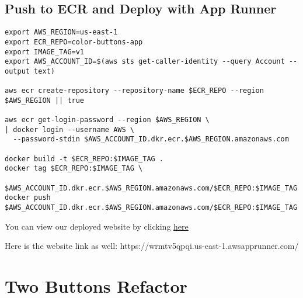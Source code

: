 \subsection{Push to ECR and Deploy with App Runner}
\begin{verbatim}
export AWS_REGION=us-east-1
export ECR_REPO=color-buttons-app
export IMAGE_TAG=v1
export AWS_ACCOUNT_ID=$(aws sts get-caller-identity --query Account --output text)

aws ecr create-repository --repository-name $ECR_REPO --region $AWS_REGION || true

aws ecr get-login-password --region $AWS_REGION \
| docker login --username AWS \
  --password-stdin $AWS_ACCOUNT_ID.dkr.ecr.$AWS_REGION.amazonaws.com

docker build -t $ECR_REPO:$IMAGE_TAG .
docker tag $ECR_REPO:$IMAGE_TAG \
  $AWS_ACCOUNT_ID.dkr.ecr.$AWS_REGION.amazonaws.com/$ECR_REPO:$IMAGE_TAG
docker push $AWS_ACCOUNT_ID.dkr.ecr.$AWS_REGION.amazonaws.com/$ECR_REPO:$IMAGE_TAG
\end{verbatim}

You can view our deployed website by clicking
\href{https://wrmtv5qpqi.us-east-1.awsapprunner.com/}{here}

Here is the website link as well:
https://wrmtv5qpqi.us-east-1.awsapprunner.com/

\section{Two Buttons Refactor}

